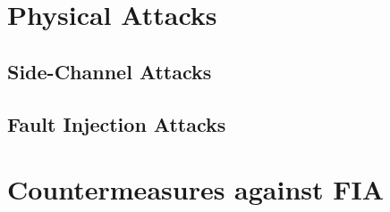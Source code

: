 \section{Physical Attacks}
    \subsection{Side-Channel Attacks}
    \subsection{Fault Injection Attacks}

\section{Countermeasures against FIA}

